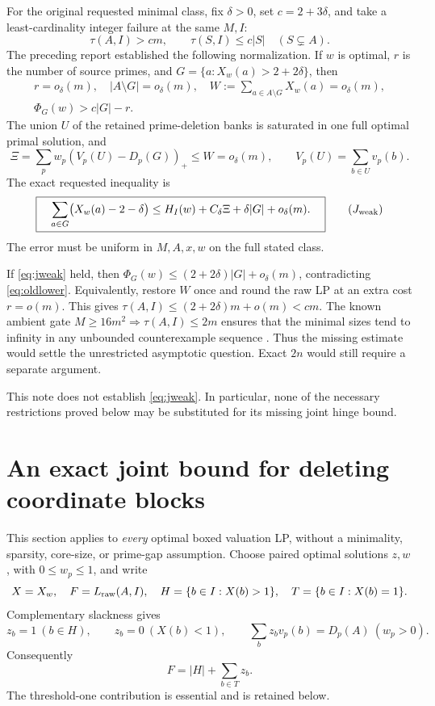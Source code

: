 \documentclass[11pt,a4paper]{article}
\theoremstyle{remark}\newtheorem{remark}[theorem]{Remark}
\newcommand{\pos}[1]{(#1)_+}
\newcommand{\LP}{L_{\rm raw}}
\begin{document}
For the original requested minimal class, fix \(\delta>0\), set
\(c=2+3\delta\), and take a least-cardinality integer failure at the same
\(M,I\):
\[
 \tau(A,I)>cm,\qquad \tau(S,I)\le c|S|\quad(S\subsetneq A).
\]
The preceding report \cite{previous} established the following
normalization. If \(w\) is optimal, \(r\) is the number of source primes,
and \(G=\{a:X_w(a)>2+2\delta\}\), then
\begin{gather}
 r=o_\delta(m),\quad |A\setminus G|=o_\delta(m),\quad
 W:=\sum_{a\in A\setminus G}X_w(a)=o_\delta(m),\label{eq:oldnorm}\\
 \Phi_G(w)>c|G|-r.\label{eq:oldlower}
\end{gather}
The union \(U\) of the retained prime-deletion banks is saturated in one
full optimal primal solution, and
\[
 \Xi=\sum_p w_p\pos{V_p(U)-D_p(G)}\le W=o_\delta(m),\qquad
 V_p(U)=\sum_{b\in U}v_p(b).
\]
The exact requested inequality is
\begin{equation}
 \boxed{\quad
 \sum_{a\in G}\bigl(X_w(a)-2-\delta\bigr)
 \le H_I(w)+C_\delta\Xi+\delta|G|+o_\delta(m).
 \quad}\tag{$J_{\rm weak}$}\label{eq:jweak}
\end{equation}
The error must be uniform in \(M,A,x,w\) on the full stated class.

If \eqref{eq:jweak} held, then
\(\Phi_G(w)\le(2+2\delta)|G|+o_\delta(m)\), contradicting
\eqref{eq:oldlower}. Equivalently, restore \(W\) once and round the raw
LP at an extra cost \(r=o(m)\). This gives
\(\tau(A,I)\le(2+2\delta)m+o(m)<cm\).
The known ambient gate \(M\ge16m^2\Rightarrow\tau(A,I)\le2m\)
ensures that the minimal sizes tend to infinity in any unbounded
counterexample sequence \cite{wang,previous}. Thus the missing estimate
would settle the unrestricted asymptotic question. Exact \(2n\) would
still require a separate argument.

This note does not establish \eqref{eq:jweak}. In particular, none of the
necessary restrictions proved below may be substituted for its missing
joint hinge bound.

\section{An exact joint bound for deleting coordinate blocks}

This section applies to \emph{every} optimal boxed valuation LP, without
a minimality, sparsity, core-size, or prime-gap assumption.
Choose paired optimal solutions \(z,w\), with \(0\le w_p\le1\), and write
\[
 X=X_w,\quad F=\LP(A,I),\quad H=\{b\in I:X(b)>1\},\quad
 T=\{b\in I:X(b)=1\}.
\]
Complementary slackness gives
\begin{equation}
 z_b=1\ (b\in H),\qquad z_b=0\ (X(b)<1),\qquad
 \sum_bz_bv_p(b)=D_p(A)\ (w_p>0).
 \label{eq:cs}
\end{equation}
Consequently
\begin{equation}
 F=|H|+\sum_{b\in T}z_b.\label{eq:Fboundary}
\end{equation}
The threshold-one contribution is essential and is retained below.
\end{document}
